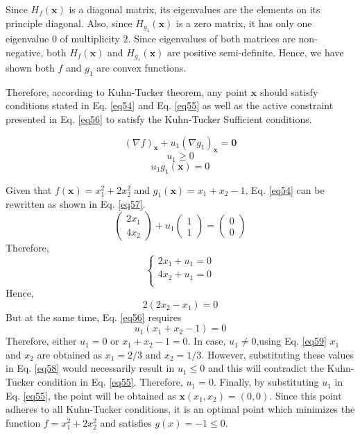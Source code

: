Since $H_f(\mathbf{x})$ is a diagonal matrix, its eigenvalues are the elements on its principle diagonal. Also, since $H_{g_1}(\mathbf{x})$ is a zero matrix, it has only one eigenvalue $0$ of multiplicity $2$. Since eigenvalues of both matrices are non-negative, both $H_f(\mathbf{x})$ and $H_{g_1}(\mathbf{x})$ are positive semi-definite. Hence, we have shown both $f$ and $g_1$ are convex functions.

Therefore, according to Kuhn-Tucker theorem, any point $\mathbf{x}$ should satisfy conditions stated in Eq. \ref{eq54} and Eq. \ref{eq55} as well as the active constraint presented in Eq. \ref{eq56} to satisfy the Kuhn-Tucker Sufficient conditions.

\begin{equation}
(\nabla f)_\mathbf{x} + u_1 (\nabla g_1)_\mathbf{x} = \mathbf{0}
\label{eq54}
\end{equation}
\begin{equation}
u_1 \geq 0
\label{eq55}
\end{equation}
\begin{equation}
u_1 g_1(\mathbf{x}) = 0
\label{eq56}
\end{equation}

Given that $f(\mathbf{x}) = x_1^2 + 2x_2^2$ and $g_1(\mathbf{x}) = x_1 + x_2 - 1$, Eq. \ref{eq54} can be rewritten as shown in Eq. \ref{eq57}.
\begin{equation}
\begin{pmatrix} 2x_1 \\ 4x_2 \end{pmatrix} + u_1 \begin{pmatrix} 1 \\ 1 \end{pmatrix} = \begin{pmatrix} 0 \\ 0 \end{pmatrix}
\label{eq57}
\end{equation}
Therefore,
\begin{equation}
\left\{ \begin{array}{ll} 2x_1+u_1 = 0\\ 4x_2 + u_1 = 0\\ \end{array}\right.
\label{eq58}
\end{equation}
Hence,
\begin{equation}
2(2x_2-x_1) = 0
\label{eq59}
\end{equation}
But at the same time, Eq. \ref{eq56} requires
\begin{equation}
u_1(x_1 + x_2 - 1) = 0
\label{eq60}
\end{equation}
Therefore, either $u_1 = 0$ or $x_1 + x_2 - 1 = 0$. In case, $u_1 \neq 0$,using Eq. \ref{eq59} $x_1$ and $x_2$ are obtained as $x_1 = 2/3$ and $x_2 = 1/3$. However, substituting these values in Eq. \ref{eq58} would necessarily result in $u_1 \leq 0$ and this will contradict the Kuhn-Tucker condition in Eq. \ref{eq55}. Therefore, $u_1 = 0$. Finally, by substituting $u_1$ in Eq. \ref{eq55}, the point will be obtained as $\mathbf{x}(x_1, x_2) = (0, 0)$. Since this point adheres to all Kuhn-Tucker conditions, it is an optimal point which minimizes the function $f = x_1^2 + 2x_2^2$ and satisfies $g(x) = -1 \leq 0$.
